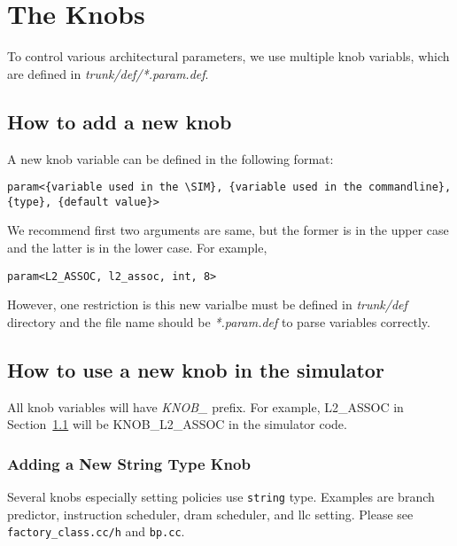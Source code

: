 
\clearpage
\section{The Knobs}
\label{sec:knob}

To control various architectural parameters, we use multiple knob
variabls, which are defined in \textit{trunk/def/*.param.def}.

\subsection{How to add a new knob}
\label{sec:knob1}

A new knob variable can be defined in the following format:

\smallskip
\begin{lstlisting}
param<{variable used in the \SIM}, {variable used in the commandline}, {type}, {default value}>
\end{lstlisting}
\smallskip

We recommend first two arguments are same, but the former is in the
upper case and the latter is in the lower case. For example,

\smallskip
\begin{lstlisting}
param<L2_ASSOC, l2_assoc, int, 8>
\end{lstlisting}
\smallskip


However, one restriction is this new varialbe must be defined
in \textit{trunk/def} directory and the file name should
be \textit{*.param.def} to parse variables correctly.


\subsection{How to use a new knob in the simulator}

All knob variables will have \textit{KNOB\_} prefix. For example,
L2\_ASSOC in Section~\ref{sec:knob1} will be KNOB\_L2\_ASSOC in the
simulator code.

\subsubsection{Adding a New String Type Knob}
Several knobs especially setting policies use {\tt string} type. 
Examples are branch predictor, instruction scheduler, dram scheduler, and llc setting. Please see {\tt factory\_class.cc/h} and {\tt bp.cc}. 






